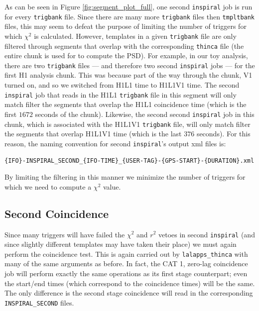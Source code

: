 As can be seen in Figure \ref{fig:segment_plot_full}, one second \texttt{inspiral} job is run for every \texttt{trigbank} file. Since there are many more \texttt{trigbank} files then \texttt{tmpltbank} files, this may seem to defeat the purpose of limiting the number of triggers for which $\chi^2$ is calculated. However, templates in a given \texttt{trigbank} file are only filtered through segments that overlap with the corresponding \texttt{thinca} file  (the entire chunk is used for to compute the \ac{PSD}). For example, in our toy analysis, there are two \texttt{trigbank} files --- and therefore two second \texttt{inspiral} jobs --- for the first H1 analysis chunk. This was because part of the way through the chunk, V1 turned on, and so we switched from H1L1 time to H1L1V1 time. The second \texttt{inspiral} job that reads in the H1L1 \texttt{trigbank} file in this segment will only match filter the segments that overlap the H1L1 coincidence time (which is the first $1672$ seconds of the chunk). Likewise, the second second \texttt{inspiral} job in this chunk, which is associated with the H1L1V1 \texttt{trigbank} file, will only match filter the segments that overlap H1L1V1 time (which is the last $376$ seconds). For this reason, the naming convention for second \texttt{inspiral}'s output xml files is:
\begin{center}
\texttt{\{IFO\}-INSPIRAL\_SECOND\_\{IFO-TIME\}\_\{USER-TAG\}-\{GPS-START\}-\{DURATION\}.xml}
\end{center}
By limiting the filtering in this manner we minimize the number of triggers for which we need to compute a $\chi^2$ value.

\subsection{Second Coincidence}
\label{sec:second_thinca}

Since many triggers will have failed the $\chi^2$ and $r^2$ vetoes in second \texttt{inspiral} (and since slightly different templates may have taken their place) we must again perform the coincidence test. This is again carried out by \texttt{lalapps\_thinca} with many of the same arguments as before. In fact, the CAT 1, zero-lag coincidence job will perform exactly the same operations as its first stage counterpart; even the start/end times (which correspond to the coincidence times) will be the same. The only difference is the second stage coincidence will read in the corresponding \texttt{INSPIRAL\_SECOND} files.

